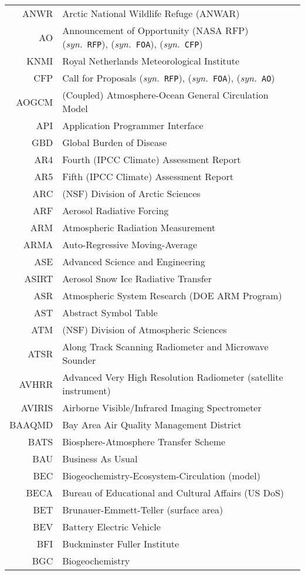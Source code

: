 \documentclass[12pt,twoside]{article}
\newcommand{\syn}[1]{(\textit{syn.}~\texttt{#1})}
\begin{document}
\begin{longtable}[>{\bfseries}l]{>{\ttfamily}r l}
ANWR & Arctic National Wildlife Refuge (ANWAR) \\
AO & Announcement of Opportunity (NASA RFP) \syn{RFP}, \syn{FOA}, \syn{CFP} \\
KNMI & Royal Netherlands Meteorological Institute \\
CFP & Call for Proposals \syn{RFP}, \syn{FOA}, \syn{AO} \\
AOGCM & (Coupled) Atmosphere-Ocean General Circulation Model \\
API & Application Programmer Interface \\
GBD & Global Burden of Disease \\
AR4 & Fourth (IPCC Climate) Assessment Report \\
AR5 & Fifth (IPCC Climate) Assessment Report \\
ARC & (NSF) Division of Arctic Sciences \\
ARF & Aerosol Radiative Forcing \\
ARM & Atmospheric Radiation Measurement \\
ARMA & Auto-Regressive Moving-Average \\
ASE & Advanced Science and Engineering \\
ASIRT & Aerosol Snow Ice Radiative Transfer \\
ASR & Atmospheric System Research (DOE ARM Program) \\
AST & Abstract Symbol Table \\
ATM & (NSF) Division of Atmospheric Sciences \\
ATSR & Along Track Scanning Radiometer and Microwave Sounder \\
AVHRR & Advanced Very High Resolution Radiometer (satellite instrument) \\
AVIRIS & Airborne Visible/Infrared Imaging Spectrometer \\
BAAQMD & Bay Area Air Quality Management District \\
BATS & Biosphere-Atmosphere Transfer Scheme \\
BAU & Business As Usual \\
BEC & Biogeochemistry-Ecosystem-Circulation (model) \\
BECA & Bureau of Educational and Cultural Affairs (US DoS) \\
BET & Brunauer-Emmett-Teller (surface area) \\
BEV & Battery Electric Vehicle \\
BFI & Buckminster Fuller Institute \\
BGC & Biogeochemistry \\

\end{longtable}
\end{document}
